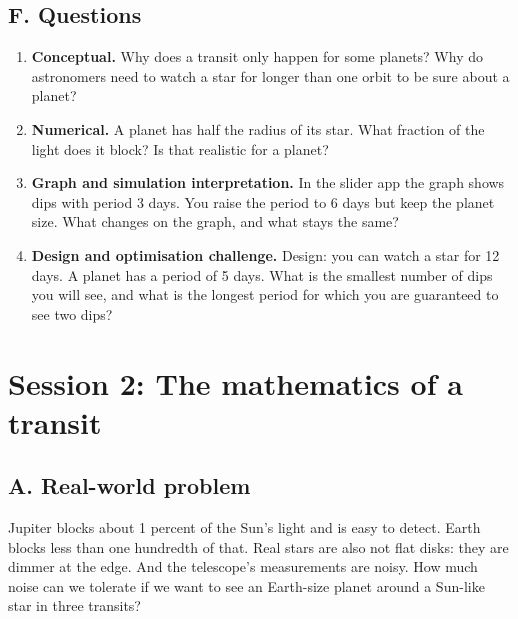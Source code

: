 \documentclass[11pt,a4paper]{article}
\begin{document}
\subsection*{F. Questions}
\begin{enumerate}[nosep]
\item \textbf{Conceptual.} Why does a transit only happen for some planets? Why do astronomers need to watch a star for longer than one orbit to be sure about a planet?
\item \textbf{Numerical.} A planet has half the radius of its star. What fraction of the light does it block? Is that realistic for a planet?
\item \textbf{Graph and simulation interpretation.} In the slider app the graph shows dips with period 3 days. You raise the period to 6 days but keep the planet size. What changes on the graph, and what stays the same?
\item \textbf{Design and optimisation challenge.} Design: you can watch a star for 12 days. A planet has a period of 5 days. What is the smallest number of dips you will see, and what is the longest period for which you are guaranteed to see two dips?
\end{enumerate}

\section{Session 2: The mathematics of a transit}

\subsection*{A. Real-world problem}
Jupiter blocks about 1 percent of the Sun's light and is easy to detect. Earth blocks less than one hundredth of that. Real stars are also not flat disks: they are dimmer at the edge. And the telescope's measurements are noisy. How much noise can we tolerate if we want to see an Earth-size planet around a Sun-like star in three transits?
\end{document}
